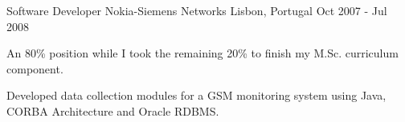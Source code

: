 \begin{cventries}
  \cventry
    {Software Developer} %
    {Nokia-Siemens Networks} %
    {Lisbon, Portugal} %
    {Oct 2007 - Jul 2008} %
    {
      \begin{cvitems} %
		\item {An 80\% position while I took the remaining 20\% to finish my M.Sc. curriculum component.}
        \item {Developed data collection modules for a GSM monitoring system using Java, CORBA Architecture and Oracle RDBMS.}
      \end{cvitems}
    }

\end{cventries}
